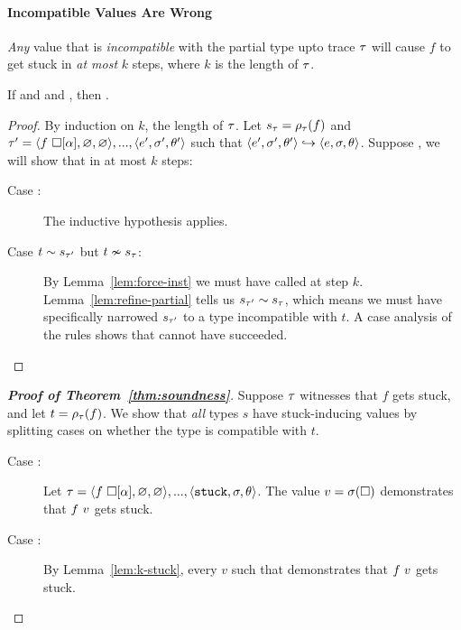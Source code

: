 \paragraph{Incompatible Values Are Wrong}
%
\emph{Any} value that is \emph{incompatible} with
the partial type upto trace $\tau$ will cause $f$ to get stuck
in \emph{at most} $k$ steps, where $k$ is the length of $\tau$.
%
\begin{lem}
\label{lem:k-stuck}
  If  and
      and
     ,
  then
     .
\end{lem}
\begin{proof}
  By induction on $k$, the length of $\tau$.
  Let $s_{\tau} = \rho_{\tau}(f)$ and
  $\tau' = \langle f\ \square[\alpha], \varnothing, \varnothing \rangle,...,\langle e', \sigma', \theta' \rangle$
  such that $\langle e', \sigma', \theta' \rangle \hookrightarrow \langle e, \sigma, \theta \rangle$.
  Suppose , we
  will show that 
  in at most $k$ steps:
%
  \begin{description}
  \item [Case :]
    The inductive hypothesis applies.
  \item [Case $t \sim s_{\tau'}$ but $t \nsim s_{\tau}$:]
    By Lemma~\ref{lem:force-inst} we must have called \forcesym at step
    $k$.
    Lemma~\ref{lem:refine-partial} tells us
    $s_{\tau'} \sim s_{\tau}$, which means we must have
    specifically narrowed $s_{\tau'}$ to a type incompatible with $t$.
    A case analysis of the rules shows that \forcesym cannot have
    succeeded.
  \end{description}
\end{proof}

\begin{proof}[\textbf{Proof of Theorem~\ref{thm:soundness}}]
%
Suppose $\tau$ witnesses that $f$ gets stuck,
and let $t = \rho_{\tau}(f)$.
We show that \emph{all} types $s$ have stuck-inducing
values by splitting cases on whether the type is
compatible with $t$. %
%
\begin{description}
\item [Case :]
  Let $\tau = \langle f\ \square[\alpha], \varnothing, \varnothing \rangle,...,\langle \mathtt{stuck}, \sigma, \theta \rangle$.
  The value $v = \sigma(\square)$ demonstrates that
  $f\ v$ gets stuck. 
\item [Case :] By Lemma~\ref{lem:k-stuck}, every $v$
  such that  demonstrates that $f\ v$ gets stuck.
\end{description}
\end{proof}

